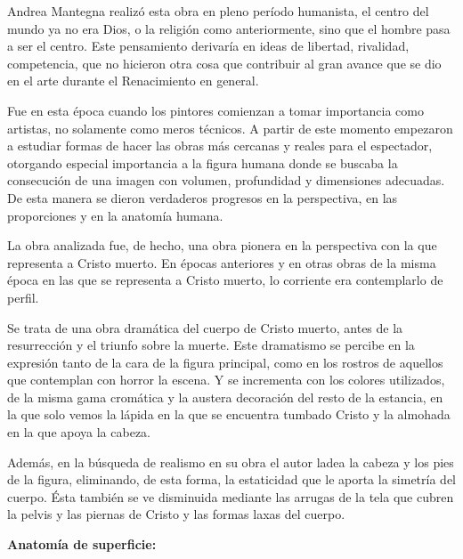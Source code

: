 Andrea Mantegna realizó esta obra en pleno período humanista, el centro del mundo ya no era Dios, o la religión como anteriormente, sino que el hombre pasa a ser el centro. Este pensamiento derivaría en ideas de libertad, rivalidad, competencia, que no hicieron otra cosa que contribuir al gran avance que se dio en el arte durante el Renacimiento en general.

Fue en esta época cuando los pintores comienzan a tomar importancia como artistas, no solamente como meros técnicos. A partir de este momento empezaron a estudiar formas de hacer las obras más cercanas y reales para el espectador, otorgando especial importancia a la figura humana donde se buscaba la consecución de una imagen con volumen, profundidad y dimensiones adecuadas. De esta manera se dieron verdaderos progresos en la perspectiva, en las proporciones y en la anatomía humana.

La obra analizada fue, de hecho, una obra pionera en la perspectiva con la que representa a Cristo muerto. En épocas anteriores y en otras obras de la misma época en las que se representa a Cristo muerto, lo corriente era contemplarlo de perfil.

Se trata de una obra dramática del cuerpo de Cristo muerto, antes de la resurrección y el triunfo sobre la muerte. Este dramatismo se percibe en la expresión tanto de la cara de la figura principal, como en los rostros de aquellos que contemplan con horror la escena. Y se incrementa con los colores utilizados, de la misma gama cromática y la austera decoración del resto de la estancia, en la que solo vemos la lápida en la que se encuentra tumbado Cristo y la almohada en la que apoya la cabeza.

Además, en la búsqueda de realismo en su obra el autor ladea la cabeza y los pies de la figura, eliminando, de esta forma, la estaticidad que le aporta la simetría del cuerpo. Ésta también se ve disminuida mediante las arrugas de la tela que cubren la pelvis y las piernas de Cristo y las formas laxas del cuerpo.



\vspace{12pt}
\textbf{Anatomía de superficie:}

